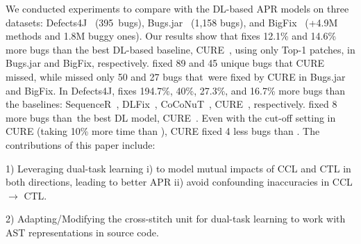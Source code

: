 We conducted experiments to compare {\tool} with the DL-based APR
models on three datasets: Defects4J~\cite{defects4j} (395~bugs),
Bugs.jar~\cite{saha2018bugs} (1,158 bugs), and
BigFix~\cite{yioopsla19} (+4.9M methods and 1.8M buggy ones). Our
results show that {\tool} fixes 12.1\% and 14.6\% more bugs than the
best DL-based baseline, CURE~\cite{cure-icse21}, using only Top-1
patches, in Bugs.jar and BigFix, respectively.
{\tool} fixed 89 and 45 unique bugs that CURE missed, while {\tool}
missed only 50 and 27 bugs that~were fixed by CURE in Bugs.jar and
BigFix. In Defects4J, {\tool} fixes 194.7\%, 40\%, 27.3\%, and 16.7\%
more bugs than the baselines: SequenceR~\cite{chen2018sequencer},
DLFix~\cite{icse20}, CoCoNuT~\cite{lutellier2020coconut},
CURE~\cite{cure-icse21}, respectively. {\tool} fixed 8 more bugs
than~the best DL model, CURE~\cite{cure-icse21}. Even with the
cut-off setting in CURE (taking 10\% more time than {\tool}), CURE
fixed 4 less bugs than {\tool}. The contributions of this paper
include:




1) Leveraging dual-task learning i) to model mutual impacts of CCL and
CTL in both directions, leading to better APR ii) avoid confounding
inaccuracies in CCL $\rightarrow$ CTL.

2) Adapting/Modifying the cross-stitch unit for dual-task
learning to work with AST representations in source code.





